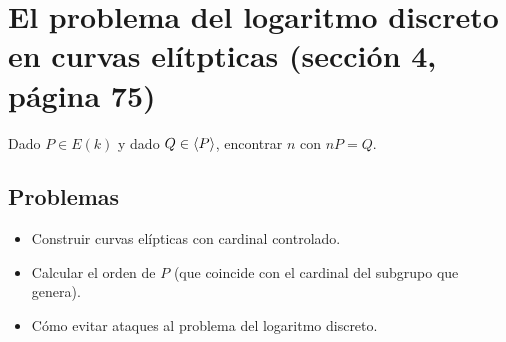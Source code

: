 \documentclass[CR.tex]{subfiles}
\begin{document}
\section{El problema del logaritmo discreto en curvas elítpticas (sección 4, página 75)}

Dado $P\in E(k)$ y dado $Q\in\langle{P}\rangle$, encontrar $n$ con $nP=Q$. 

\subsection{Problemas}
\begin{itemize}
\item Construir curvas elípticas con cardinal controlado.
\item Calcular el orden de $P$ (que coincide con el cardinal del subgrupo que genera).
\item Cómo evitar ataques al problema del logaritmo discreto. 
\end{itemize}
\end{document}
